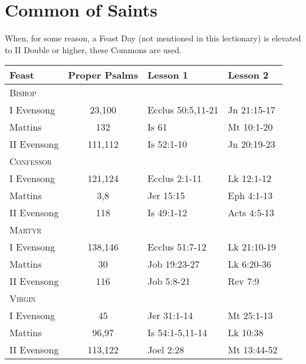 \section{Common of Saints}
\begin{secrubric}
	When, for some reason, a Feast Day (not mentioned in this lectionary) is elevated to II Double or higher, these Commons are used.
\end{secrubric}
\begin{longtable}{l c l l}
\multicolumn{1}{l}{Feast}&\multicolumn{1}{l}{Proper Psalms}&\multicolumn{1}{l}{Lesson 1}& \multicolumn{1}{l}{Lesson 2}\\
\hline
\endhead
\multicolumn{4}{l}{\textsc{Bishop}}\\
\hspace{1em} I Evensong&23,100&Ecclus 50:5,11-21&Jn 21:15-17\\
\hspace{1em} Mattins&132&Is 61&Mt 10:1-20\\
\hspace{1em} II Evensong&111,112&Is 52:1-10&Jn 20:19-23\\
%
\multicolumn{4}{l}{\textsc{Confessor}}\\
\hspace{1em} I Evensong&121,124&Ecclus 2:1-11&Lk 12:1-12\\
\hspace{1em} Mattins&3,8&Jer 15:15&Eph 4:1-13\\
\hspace{1em} II Evensong&118&Is 49:1-12&Acts 4:5-13\\
%
\multicolumn{4}{l}{\textsc{Martyr}}\\
\hspace{1em} I Evensong&138,146&Ecclus 51:7-12&Lk 21:10-19\\
\hspace{1em} Mattins&30&Job 19:23-27&Lk 6:20-36\\
\hspace{1em} II Evensong&116&Job 5:8-21&Rev 7:9\\
%
\multicolumn{4}{l}{\textsc{Virgin}}\\
\hspace{1em} I Evensong&45&Jer 31:1-14&Mt 25:1-13\\
\hspace{1em} Mattins&96,97&Is 54:1-5,11-14&Lk 10:38\\
\hspace{1em} II Evensong&113,122&Joel 2:28&Mt 13:44-52\\

\end{longtable}
